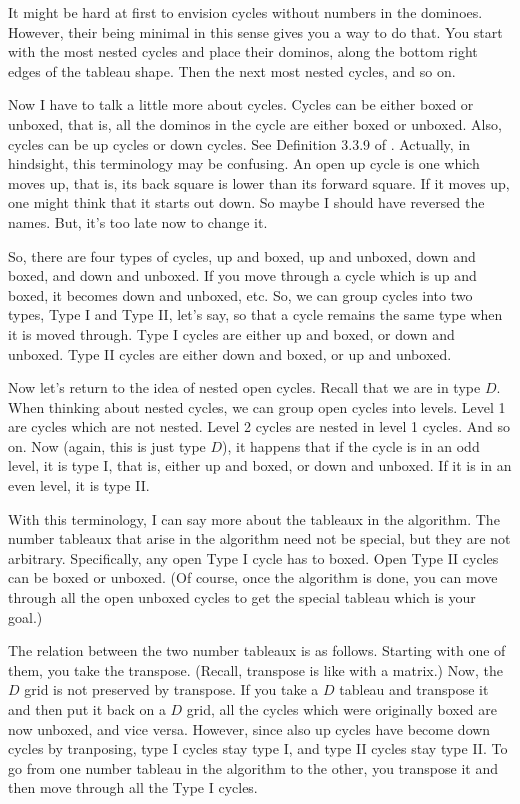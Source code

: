 \documentclass[12pt]{article}
\numberwithin{equation}{section}
\theoremstyle{definition}
\theoremstyle{remark}
\begin{document}
  It might be hard at first to envision cycles without numbers in the dominoes.
  However, their being minimal in this sense gives you a way to do that.
  You start with the most nested cycles and place their dominos, along the bottom right edges of the tableau shape.
  Then the next most nested cycles, and so on.

  Now I have to talk a little more about cycles.
  Cycles can be either boxed or unboxed, that is, all the dominos in the cycle are either boxed or unboxed.
  Also, cycles can be up cycles or down cycles.
  See Definition 3.3.9 of \cite{garfinkle_1993}.
  Actually, in hindsight, this terminology may be confusing.
  An open up cycle is one which moves up, that is, its back square is lower than its forward square.
  If it moves up, one might think that it starts out down.
  So maybe I should have reversed the names.
  But, it's too late now to change it.

  So, there are four types of cycles, up and boxed, up and unboxed, down and boxed, and down and unboxed.
  If you move through a cycle which is up and boxed, it becomes down and unboxed, etc.
  So, we can group cycles into two types, Type I and Type II, let's say, so that a cycle remains the same type when it is moved through.
  Type I cycles are either up and boxed, or down and unboxed.
  Type II cycles are either down and boxed, or up and unboxed.

  Now let's return to the idea of nested open cycles.
  Recall that we are in type $D$.
  When thinking about nested cycles, we can group open cycles into levels.
  Level 1 are cycles which are not nested.
  Level 2 cycles are nested in level 1 cycles.
  And so on.
  Now (again, this is just type $D$), it happens that if the cycle is in an odd level, it is type I, that is, either up and boxed, or down and unboxed.
  If it is in an even level, it is type II.

  With this terminology, I can say more about the tableaux in the algorithm.
  The number tableaux that arise in the algorithm need not be special, but they are not arbitrary.
  Specifically, any open Type I cycle has to boxed.
  Open Type II cycles can be boxed or unboxed.
  (Of course, once the algorithm is done, you can move through all the open unboxed cycles to get the special tableau which is your goal.)

  The relation between the two number tableaux is as follows.
  Starting with one of them, you take the transpose.
  (Recall, transpose is like with a matrix.)
  Now, the $D$ grid is not preserved by transpose.
  If you take a $D$ tableau and transpose it and then put it back on a $D$ grid, all the cycles which were originally boxed are now unboxed, and vice versa.
  However, since also up cycles have become down cycles by tranposing, type I cycles stay type I, and type II cycles stay type II.
  To go from one number tableau in the algorithm to the other, you transpose it and then move through all the Type I cycles.
\end{document}
